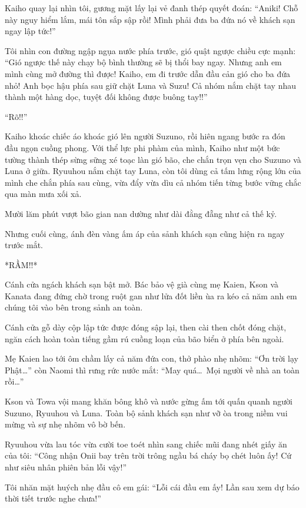 \documentclass[../main.tex]{subfiles}
\begin{document}
Kaiho quay lại nhìn tôi, gương mặt lấy lại vẻ đanh thép quyết đoán: ``Aniki! Chỗ này nguy hiểm lắm, mái tôn sắp sập rồi! Mình phải đưa ba đứa nó về khách sạn ngay lập tức!''

Tôi nhìn con đường ngập ngụa nước phía trước, gió quật ngược chiều cực mạnh: ``Gió ngược thế này chạy bộ bình thường sẽ bị thổi bay ngay. Nhưng anh em mình cùng mở đường thì được! Kaiho, em đi trước dẫn đầu cản gió cho ba đứa nhỏ! Anh bọc hậu phía sau giữ chặt Luna và Suzu! Cả nhóm nắm chặt tay nhau thành một hàng dọc, tuyệt đối không được buông tay!!''

``Rõ!!''

Kaiho khoác chiếc áo khoác gió lên người Suzuno, rồi hiên ngang bước ra đón đầu ngọn cuồng phong. Với thể lực phi phàm của mình, Kaiho như một bức tường thành thép sừng sững xé toạc làn gió bão, che chắn trọn vẹn cho Suzuno và Luna ở giữa. Ryuuhou nắm chặt tay Luna, còn tôi dùng cả tấm lưng rộng lớn của mình che chắn phía sau cùng, vừa đẩy vừa dìu cả nhóm tiến từng bước vững chắc qua màn mưa xối xả.

Mười lăm phút vượt bão gian nan dường như dài đằng đẵng như cả thế kỷ.

Nhưng cuối cùng, ánh đèn vàng ấm áp của sảnh khách sạn cũng hiện ra ngay trước mắt.

*RẦM!!*

Cánh cửa ngách khách sạn bật mở. Bác bảo vệ già cùng mẹ Kaien, Kson và Kanata đang đứng chờ trong ruột gan như lửa đốt liền ùa ra kéo cả năm anh em chúng tôi vào bên trong sảnh an toàn.

Cánh cửa gỗ dày cộp lập tức được đóng sập lại, then cài then chốt đóng chặt, ngăn cách hoàn toàn tiếng gầm rú cuồng loạn của bão biển ở phía bên ngoài.

Mẹ Kaien lao tới ôm chầm lấy cả năm đứa con, thở phào nhẹ nhõm: ``Ơn trời lạy Phật\dots'' còn Naomi thì rưng rức nước mắt: ``May quá\dots\ Mọi người về nhà an toàn rồi\dots''

Kson và Towa vội mang khăn bông khô và nước gừng ấm tới quấn quanh người Suzuno, Ryuuhou và Luna. Toàn bộ sảnh khách sạn như vỡ òa trong niềm vui mừng và sự nhẹ nhõm vô bờ bến.

Ryuuhou vừa lau tóc vừa cười toe toét nhìn sang chiếc mũi đang nhét giấy ăn của tôi: ``Công nhận Onii bay trên trời trông ngầu bá cháy bọ chét luôn ấy! Cứ như siêu nhân phiên bản lỗi vậy!''

Tôi nhăn mặt huých nhẹ đầu cô em gái: ``Lỗi cái đầu em ấy! Lần sau xem dự báo thời tiết trước nghe chưa!''
\end{document}
